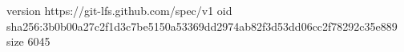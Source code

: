version https://git-lfs.github.com/spec/v1
oid sha256:3b0b00a27c2f1d3c7be5150a53369dd2974ab82f3d53dd06cc2f78292c35e889
size 6045
